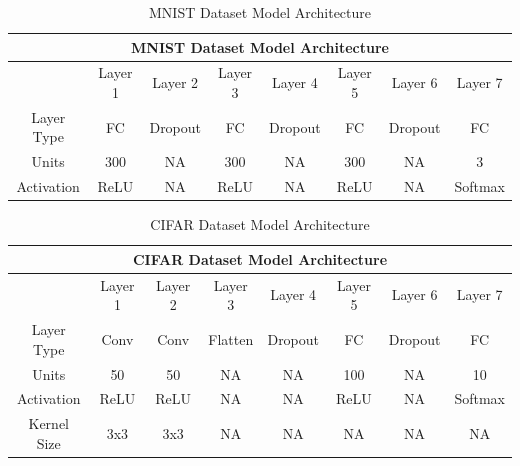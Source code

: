\begin{table}[h!]
\caption{MNIST Dataset Model Architecture} \label{tab:MNISTArchitecture}
\begin{tabular}{|c||c|c|c|c|c|c|c|}
\hline
\multicolumn{8}{|c|}{MNIST Dataset Model Architecture} \\
\hline
 & Layer 1 & Layer 2 & Layer 3& Layer 4 &Layer 5 & Layer 6 & Layer 7 \\
\hline
\hline
Layer Type & FC & Dropout & FC & Dropout & FC & Dropout  & FC \\
\hline
Units & 300 & NA & 300 & NA & 300 & NA & 3 \\
\hline
Activation & ReLU & NA & ReLU & NA & ReLU & NA & Softmax \\
\hline
\end{tabular}
\end{table}

\begin{table}[h!]
\caption{CIFAR Dataset Model Architecture} \label{tab:CIFARArchitecture}
\begin{tabular}{|c||c|c|c|c|c|c|c|}
\hline
\multicolumn{8}{|c|}{CIFAR Dataset Model Architecture} \\
\hline
 & Layer 1 & Layer 2 & Layer 3& Layer 4 &Layer 5 & Layer 6 & Layer 7 \\
\hline
\hline
Layer Type & Conv & Conv & Flatten & Dropout & FC & Dropout  & FC \\
\hline
Units & 50 & 50 & NA & NA & 100 & NA & 10 \\
\hline
Activation & ReLU &ReLU & NA & NA & ReLU & NA & Softmax \\
\hline
Kernel Size & 3x3 &3x3 & NA &NA &NA &NA &NA  \\
\hline
\end{tabular}
\end{table}


